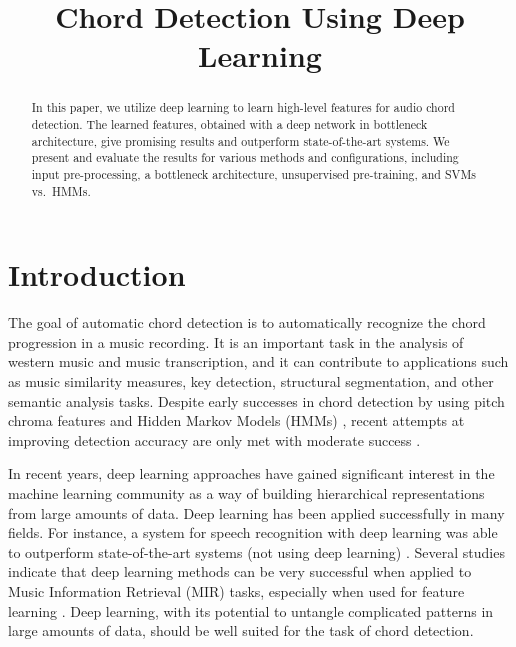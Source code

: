 \documentclass{article}
\title{Chord Detection Using Deep Learning}
\begin{document}
%
\maketitle
%
\begin{abstract}
In this paper, we utilize deep learning to learn high-level features for audio chord detection. The learned features, obtained with a deep network in bottleneck architecture, give promising results and outperform state-of-the-art systems. We present and evaluate the results for various methods and configurations, including input pre-processing, a bottleneck architecture, unsupervised pre-training, and SVMs vs.\ HMMs. 
\end{abstract}
%
\section{Introduction}
The goal of automatic chord detection is to automatically recognize the chord progression in a music recording. It is an important task in the analysis of western music and music transcription, and it can contribute to applications such as music similarity measures, key detection, structural segmentation, and other semantic analysis tasks. Despite early successes in chord detection by using pitch chroma features and Hidden Markov Models (HMMs) \cite{fujishima1999realtime}, recent attempts at improving detection accuracy are only met with moderate success \cite{ueda2010hmm,cho2013mirex}. 

In recent years, deep learning approaches have gained significant interest in the machine learning community as a way of building hierarchical representations from large amounts of data. Deep learning has been applied successfully in many fields. For instance, a system for speech recognition with deep learning was able to outperform state-of-the-art systems (not using deep learning) \cite{hinton2012deep}. Several studies indicate that deep learning methods can be very successful when applied to Music Information Retrieval (MIR) tasks, especially when used for feature learning \cite{lee2009unsupervised,battenberg2012analyzing,humphrey2012moving,hamel2010learning}. Deep learning, with its potential to untangle complicated patterns in large amounts of data, should be well suited for the task of chord detection.
\end{document}
